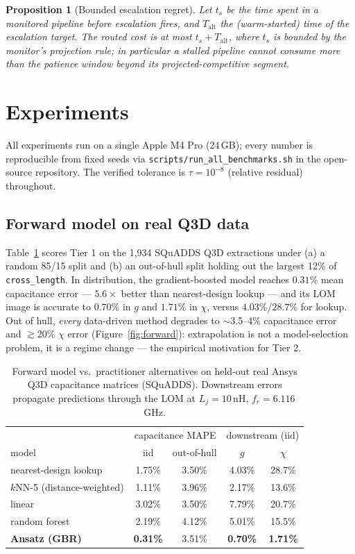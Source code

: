 \documentclass[11pt]{article}
\newtheorem{proposition}{Proposition}
\newcommand{\capmapegbr}{0.31\%}
\newcommand{\gerrgbr}{0.70\%}
\newcommand{\gerrnn}{4.03\%}
\newcommand{\chierrgbr}{1.71\%}
\newcommand{\chierrnn}{28.7\%}
\begin{document}
\begin{proposition}[Bounded escalation regret]
Let $t_s$ be the time spent in a monitored pipeline before escalation fires,
and $T_{\mathrm{alt}}$ the (warm-started) time of the escalation target. The
routed cost is at most $t_s + T_{\mathrm{alt}}$, where $t_s$ is bounded by the
monitor's projection rule; in particular a stalled pipeline cannot consume
more than the patience window beyond its projected-competitive segment.
\end{proposition}

\section{Experiments}
\label{sec:experiments}

All experiments run on a single Apple M4 Pro (24\,GB); every number is
reproducible from fixed seeds via \texttt{scripts/run\_all\_benchmarks.sh} in
the open-source repository. The verified tolerance is $\tau = 10^{-8}$
(relative residual) throughout.

\subsection{Forward model on real Q3D data}
\label{sec:exp-forward}

Table~\ref{tab:forward} scores Tier 1 on the 1{,}934 SQuADDS Q3D extractions
under (a) a random 85/15 split and (b) an out-of-hull split holding out the
largest 12\% of \texttt{cross\_length}. In distribution, the gradient-boosted
model reaches $\capmapegbr$ mean capacitance error --- $5.6\times$ better than
nearest-design lookup --- and its LOM image is accurate to $\gerrgbr$ in $g$
and $\chierrgbr$ in $\chi$, versus $\gerrnn$/$\chierrnn$ for lookup. Out of
hull, \emph{every} data-driven method degrades to $\sim$3.5--4\% capacitance
error and $\gtrsim$20\% $\chi$ error (Figure~\ref{fig:forward}): extrapolation
is not a model-selection problem, it is a regime change --- the empirical
motivation for Tier 2.

\begin{table}[t]
\centering\small
\begin{tabular}{lcccc}
\toprule
 & \multicolumn{2}{c}{capacitance MAPE} & \multicolumn{2}{c}{downstream (iid)} \\
model & iid & out-of-hull & $g$ & $\chi$ \\
\midrule
nearest-design lookup & 1.75\% & 3.50\% & 4.03\% & 28.7\% \\
$k$NN-5 (distance-weighted) & 1.11\% & 3.96\% & 2.17\% & 13.6\% \\
linear & 3.02\% & 3.50\% & 7.79\% & 20.7\% \\
random forest & 2.19\% & 4.12\% & 5.01\% & 15.5\% \\
\textbf{Ansatz (GBR)} & \textbf{0.31\%} & 3.51\% & \textbf{0.70\%} & \textbf{1.71\%} \\
\bottomrule
\end{tabular}
\caption{Forward model vs.\ practitioner alternatives on held-out real Ansys
Q3D capacitance matrices (SQuADDS). Downstream errors propagate predictions
through the LOM at $L_j = 10$\,nH, $f_r = 6.116$\,GHz.}
\label{tab:forward}
\end{table}
\end{document}
